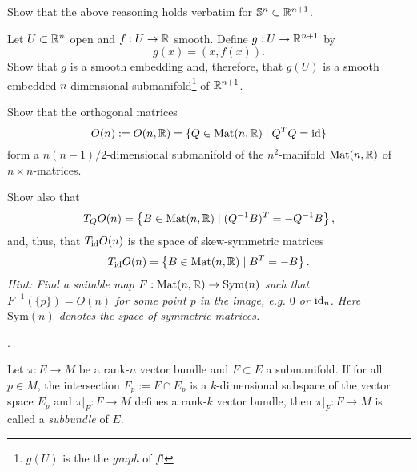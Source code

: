 \begin{exercise}
  Show that the above reasoning holds verbatim for $\mathbb{S}^n\subset\mathbb{R}^{n+1}$.
\end{exercise}

\begin{exercise}
  Let $U\subset\mathbb{R}^n$ open and $f:U\to\mathbb{R}$ smooth.
  Define $g:U\to\mathbb{R}^{n+1}$ by
  \begin{equation}
    g(x) = (x, f(x)).
  \end{equation} 
  Show that $g$ is a smooth embedding and, therefore, that $g(U)$ is a smooth embedded $n$-dimensional submanifold\footnote{$g(U)$ is the the \emph{graph} of $f$!} of $\mathbb{R}^{n+1}$.
\end{exercise}

\begin{exercise}[\textit{[homework 2]}]\label{exe:onsubmanifold}
  Show that the orthogonal matrices
  \begin{equation}
    O(n) := O(n, \mathbb{R}) = \{ Q\in \mathrm{Mat}(n, \mathbb{R}) \mid Q^TQ=\operatorname{id} \}
  \end{equation}
  form a $n(n-1)/2$-dimensional submanifold of the $n^2$-manifold $\mathrm{Mat}(n, \mathbb{R})$ of $n\times n$-matrices.

  Show also that
  \begin{equation}
    T_Q O(n) = \left\lbrace B \in \mathrm{Mat}(n, \mathbb{R}) \mid (Q^{-1} B)^T = -Q^{-1}B \right\rbrace,
  \end{equation}
  and, thus, that $T_{\operatorname{id}} O(n)$ is the space of skew-symmetric matrices
  \begin{equation}
    T_{\operatorname{id}} O(n) = \left\{ B \in \mathrm{Mat}(n, \mathbb{R}) \mid B^T = -B \right\}.
  \end{equation}
  \textit{\small Hint: Find a suitable map $F: \mathrm{Mat}(n, \mathbb{R}) \to \mathrm{Sym}(n)$ such that $F^{-1}(\{p\}) = O(n)$ for some point $p$ in the image, e.g. $0$ or $\operatorname{id}_n$.
  Here $\mathrm{Sym}(n)$ denotes the space of symmetric matrices.}
\end{exercise}

.
\begin{definition}
  Let $\pi:E \to M$ be a rank-$n$ vector bundle and $F\subset E$ a submanifold.
  If for all $p\in M$, the intersection $F_p := F\cap E_p$ is a $k$-dimensional subspace of the vector space $E_p$ and $\pi|_F : F \to M$ defines a rank-$k$ vector bundle, then $\pi|_F: F \to M$ is called a \emph{subbundle} of $E$.
\end{definition}

